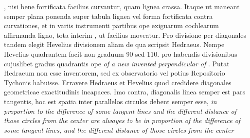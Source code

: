 \count{}
\count{}
\count{}
\pstart {}\protect{}, nisi bene fortificata facilius curvantur, quam lignea crassa. Itaque ut maneant semper plana ponenda super tabula lignea vel forma  fortificata contra curvationes, et in variis instrumenti partibus ope exiguarum cochlearum affirmanda ligno, tota interim , ut facilius moveatur.
\pend 
\pstart Pro divisione per diagonales tandem elegit Hevelius\protect{} divisionem aliam de qua scripsit Hedraeus\protect{}. Nempe Hevelius\protect{} quadrantem\protect{} facit non graduum 90 sed 110. pro habendis divisionibus cujuslibet gradus quadrantis\protect{} ope \textit{of a new invented perpendicular of} . Putat Hedraeum\protect{} non esse inventorem, sed ex observatorio vel potius Repositorio Tychonis\protect{} habuisse. Erravere Hedraeus\protect{} et Hevelius\protect{} quod credidere diagonales geometricae exactitudinis incapaces. Imo contra, diagonalis linea semper est pars tangentis, hoc est spatia inter parallelos circulos debent semper esse, \textit{in proportion to the difference of some tangent lines and the different distance of those circles from the center are alwayes to be in proportion of the difference of some tangent lines, and the different distance of those circles from the center}   
